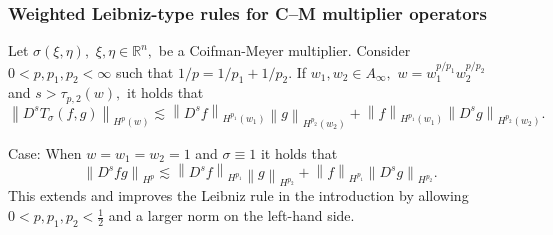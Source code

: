 \documentclass[xcolor=dvipsnames]{beamer}
\newcommand{\rn}{{{\mathbb R}^n}}
\newcommand{\norm}[2]{{\left\| #1 \right\|}_{#2}}
\newcommand{\hcline}{1/p=1/p_1+1/p_2}
\begin{document}
\begin{frame}\frametitle{Weighted Leibniz-type rules for C--M multiplier operators}



\begin{corollary}\label{coro:KP:CM:Hardy}
Let $\sigma(\xi,\eta),$ $\xi,\eta\in\rn,$ be a Coifman-Meyer multiplier. 
Consider  $0 < p, p_1, p_2  < \infty$  such that $\hcline.$ If  $w_1,w_2\in A_\infty,$  $w=w_1^{{p}/{p_1}} w_2^{{p}/{p_2}}$ and   $s > \tau_{p,2}(w),$ it holds that
\begin{equation*}\label{KP:CM:Hardy}
\norm{D^sT_\sigma(f,g)}{H^p(w)} \lesssim \norm{D^s f}{H^{p_1}(w_1)} \norm{g}{H^{p_2}(w_2)} +  \norm{f}{H^{p_1}(w_1)}   \norm{D^s g}{H^{p_2}(w_2)}.
\end{equation*}
\end{corollary}

\medskip



 Case: When $w =w_1=w_2=1$ and $\sigma\equiv 1$ it holds that 
 \[ \norm{D^sfg}{H^p} \lesssim \norm{D^s f}{H^{p_1}} \norm{g}{H^{p_2}} +  \norm{f}{H^{p_1}}   \norm{D^s g}{H^{p_2}}.\]
 This extends and improves the Leibniz rule in the introduction by allowing $0<p,p_1,p_2<\frac{1}{2}$ and a larger norm on the left-hand side.

\end{frame}
\end{document}
